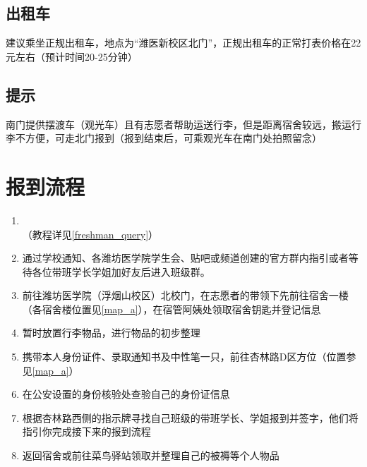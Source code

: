 \subsection[出租车]{出租车}
建议乘坐正规出租车，地点为“潍医新校区北门”，正规出租车的正常打表价格在22元左右（预计时间20-25分钟）

\subsection[提示]{提示}
南门提供摆渡车（观光车）且有志愿者帮助运送行李，但是距离宿舍较远，搬运行李不方便，可走北门报到（报到结束后，可乘观光车在南门处拍照留念）

\section[报到流程]{报到流程}
\begin{enumerate}
      \item \textbf{\\}\footnotemark（教程详见\uline{\ref{freshman_query}}）
      \item 通过学校通知、各潍坊医学院学生会、贴吧或频道创建的官方群内指引或者等待各位带班学长学姐加好友后进入班级群\footnotemark。
      \item 前往潍坊医学院（浮烟山校区）北校门，在志愿者\footnotemark 的带领下先前往宿舍一楼（各宿舍楼位置见\uline{\ref{map_a}}），在宿管阿姨处领取宿舍钥匙并登记信息
      \item 暂时放置行李物品，进行物品的初步整理
      \item 携带本人身份证件、录取通知书\footnotemark 及中性笔一只，前往杏林路D区方位（位置参见\uline{\ref{map_a}}）
      \item 在公安设置的身份核验处查验自己的身份证\footnotemark 信息
      \item 根据杏林路西侧的指示牌寻找自己班级的带班学长、学姐报到并签字，他们将指引你完成接下来的报到流程\footnotemark
      \item 返回宿舍或前往菜鸟驿站领取并整理自己的被褥等个人物品
\end{enumerate}